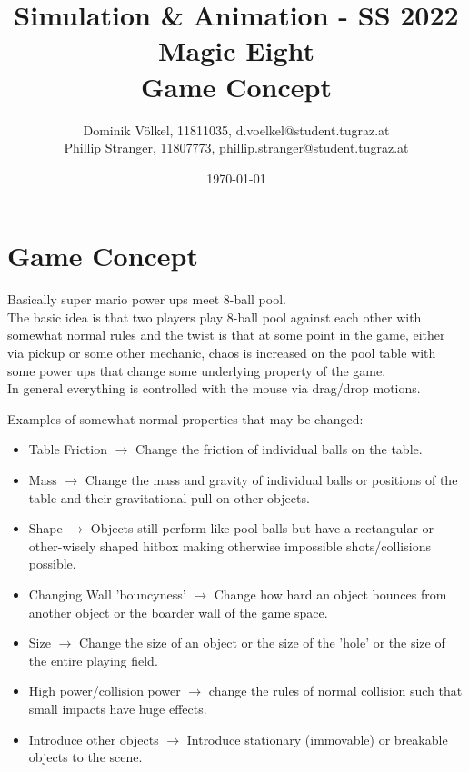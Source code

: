 \documentclass{article}
\title{	
	\large Simulation \& Animation - SS 2022\\
	\Huge{Magic Eight}\\
	\huge{Game Concept}
}
\author{\parbox{\textwidth}{\centering
	Dominik V\"olkel, 11811035, d.voelkel@student.tugraz.at\\%
	Phillip Stranger, 11807773, phillip.stranger@student.tugraz.at\\%
}}
\date{\today}
\begin{document}
\maketitle

\section{Game Concept}

Basically super mario power ups meet 8-ball pool.\\
The basic idea is that two players play 8-ball pool against each other with somewhat normal rules and the twist is that at some point in the game, either via pickup or some other mechanic, chaos is increased on the pool table with some power ups that change some underlying property of the game. \\

In general everything is controlled with the mouse via drag/drop motions.

Examples of somewhat normal properties that may be changed:

\begin{itemize}
	\item Table Friction $\rightarrow$ Change the friction of individual balls on the table.
	\item Mass $\rightarrow$ Change the mass and gravity of individual balls or positions of the table and their gravitational pull on other objects.
	\item Shape $\rightarrow$ Objects still perform like pool balls but have a rectangular or other-wisely shaped hitbox making otherwise impossible shots/collisions possible.
	\item Changing Wall 'bouncyness' $\rightarrow$ Change how hard an object bounces from another object or the boarder wall of the game space.
	\item Size $\rightarrow$ Change the size of an object or the size of the 'hole' or the size of the entire playing field.
	\item High power/collision power $\rightarrow$ change the rules of normal collision such that small impacts have huge effects.
	\item Introduce other objects  $\rightarrow$ Introduce stationary (immovable) or breakable objects to the scene.
\end{itemize}
\end{document}
